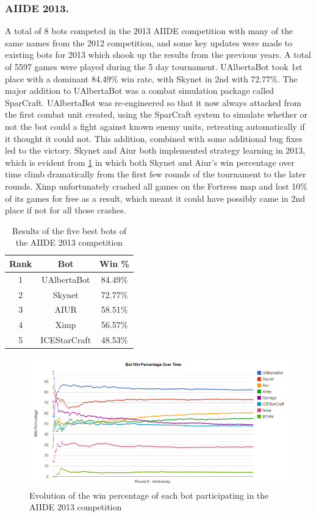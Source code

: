 \documentclass{llncs}
\begin{document}
\subsubsection{AIIDE 2013.}

A total of 8 bots competed in the 2013 AIIDE competition with many of the same names from the 2012 competition, and some key updates were made to existing bots for 2013 which shook up the results from the previous years. A total of 5597 games were played during the 5 day tournament. UAlbertaBot took 1st place with a dominant 84.49\% win rate, with Skynet in 2nd with 72.77\%. The major addition to UAlbertaBot was a combat simulation package called SparCraft. UAlbertaBot was re-engineered so that it now always attacked from the first combat unit created, using the SparCraft system to simulate whether or not the bot could a fight against known enemy units, retreating automatically if it thought it could not. This addition, combined with some additional bug fixes led to the victory. Skynet and Aiur both implemented strategy learning in 2013, which is evident from \ref{fig:aiide2013} in which both Skynet and Aiur's win percentage over time climb dramatically from the first few rounds of the tournament to the later rounds. Ximp unfortunately crashed all games on the Fortress map and lost 10\% of its games for free as a result, which meant it could have possibly came in 2nd place if not for all those crashes. 

\begin{table}[!t]
\caption{Results of the five best bots of the AIIDE 2013 competition}
\label{tab:aiide2013}
\centering
\begin{tabular}{|c|c|c|}
\hline
{\bfseries Rank} & {\bfseries Bot} & {\bfseries Win \%} \\
\hline
1 & UAlbertaBot & 84.49\% \\
2 & Skynet & 72.77\% \\
3 & AIUR & 58.51\% \\
4 & Ximp & 56.57\% \\
5 & ICEStarCraft & 48.53\% \\
\hline
\end{tabular}
\end{table}

\begin{figure}[t!]
    \centering
    \includegraphics[width=\columnwidth]{figures/aiide2013}
    \caption{Evolution of the win percentage of each bot participating in the AIIDE 2013 competition}
    \label{fig:aiide2013}
\end{figure}
\end{document}
